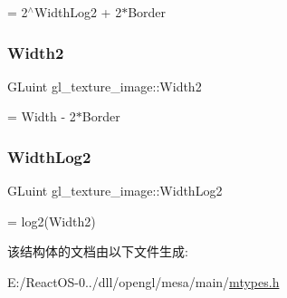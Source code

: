 = 2$^\wedge$\+Width\+Log2 + 2$\ast$\+Border \mbox{\label{structgl__texture__image_a9724b743b168c804c080912c57e3961d}} 
\subsubsection{\texorpdfstring{Width2}{Width2}}
{\footnotesize\ttfamily G\+Luint gl\+\_\+texture\+\_\+image\+::\+Width2}

= Width -\/ 2$\ast$\+Border \mbox{\label{structgl__texture__image_a9cdd9a992878f0f281f0336865290b69}} 
\subsubsection{\texorpdfstring{Width\+Log2}{WidthLog2}}
{\footnotesize\ttfamily G\+Luint gl\+\_\+texture\+\_\+image\+::\+Width\+Log2}

= log2(\+Width2) 

该结构体的文档由以下文件生成\+:\begin{DoxyCompactItemize}
\item 
E\+:/\+React\+O\+S-\/0../dll/opengl/mesa/main/\hyperlink{mtypes_8h}{mtypes.\+h}\end{DoxyCompactItemize}
